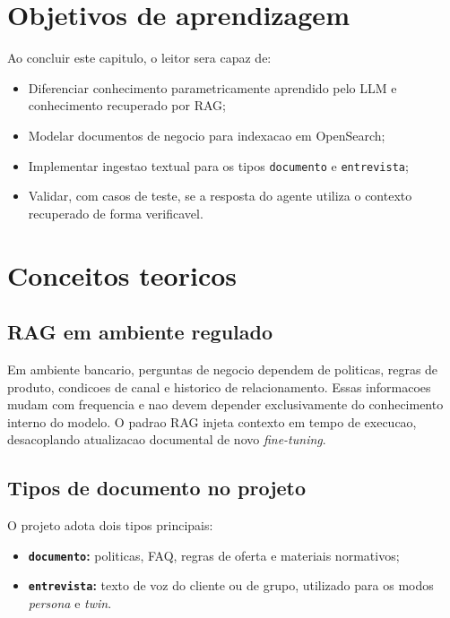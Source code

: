 \section{Objetivos de aprendizagem}

Ao concluir este capitulo, o leitor sera capaz de:

\begin{itemize}[leftmargin=*]
  \item Diferenciar conhecimento parametricamente aprendido pelo LLM e
        conhecimento recuperado por RAG;
  \item Modelar documentos de negocio para indexacao em
        OpenSearch;
  \item Implementar ingestao textual para os tipos
        \texttt{documento} e \texttt{entrevista};
  \item Validar, com casos de teste, se a resposta do agente utiliza o
        contexto recuperado de forma verificavel.
\end{itemize}

\section{Conceitos teoricos}

\subsection{RAG em ambiente regulado}

Em ambiente bancario, perguntas de negocio dependem de politicas, regras de
produto, condicoes de canal e historico de relacionamento. Essas informacoes
mudam com frequencia e nao devem depender exclusivamente do conhecimento
interno do modelo. O padrao RAG injeta contexto em tempo de execucao,
desacoplando atualizacao documental de novo \textit{fine-tuning}.

\subsection{Tipos de documento no projeto}

O projeto adota dois tipos principais:

\begin{itemize}[leftmargin=*]
  \item \textbf{\texttt{documento}:} politicas, FAQ, regras de oferta e
        materiais normativos;
  \item \textbf{\texttt{entrevista}:} texto de voz do cliente ou de grupo,
        utilizado para os modos \textit{persona} e \textit{twin}.
\end{itemize}

